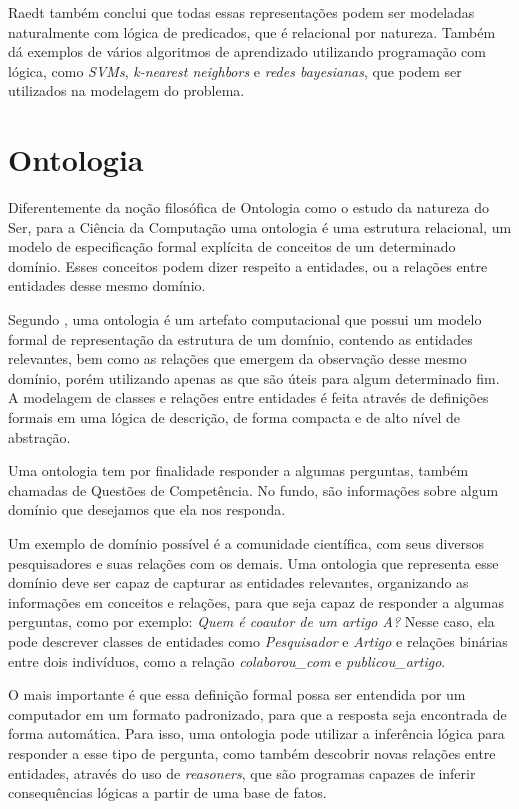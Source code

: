Raedt também conclui que todas essas representações podem ser modeladas naturalmente com lógica de predicados, que é relacional por natureza. Também dá exemplos de vários algoritmos de aprendizado utilizando programação com lógica,
como \textit{SVMs}, \textit{k-nearest neighbors} e \textit{redes bayesianas}, que podem ser utilizados na modelagem do problema.

\section{Ontologia}
\label{sec:ontologia}

Diferentemente da noção filosófica de Ontologia como o estudo da natureza do Ser, para a Ciência da Computação uma ontologia é uma estrutura relacional, um modelo de especificação formal explícita de conceitos de um determinado domínio.
Esses conceitos podem dizer respeito a entidades, ou a relações entre entidades desse mesmo domínio.

Segundo \citet{Guarino2009}, uma ontologia é um artefato computacional que possui um modelo formal de representação da estrutura de um domínio, contendo as entidades relevantes, bem como as relações que emergem da observação desse mesmo domínio, porém utilizando apenas as que são úteis para algum determinado fim. A modelagem de classes e relações entre entidades é feita através de definições formais em uma lógica de descrição, de forma compacta e de alto nível de abstração.

Uma ontologia tem por finalidade responder a algumas perguntas, também chamadas de Questões de Competência. No fundo, são informações sobre algum domínio que desejamos que ela nos responda.

Um exemplo de domínio possível é a comunidade científica, com seus diversos pesquisadores e suas relações com os demais. Uma ontologia que representa esse domínio deve ser capaz de capturar as entidades relevantes, organizando as informações em conceitos e relações, para que seja capaz de responder a algumas perguntas, como por exemplo: \textit{Quem é coautor de um artigo A?} Nesse caso, ela pode descrever classes de entidades como \textit{Pesquisador} e \textit{Artigo} e relações binárias entre dois indivíduos, como a relação \textit{colaborou\_com} e \textit{publicou\_artigo}.

O mais importante é que essa definição formal possa ser entendida por um computador em um formato padronizado, para que a resposta seja encontrada de forma automática. Para isso, uma ontologia pode utilizar a inferência lógica para responder a esse tipo de pergunta, como também descobrir novas relações entre entidades, através do uso de \textit{reasoners}, que são programas capazes de inferir consequências lógicas a partir de uma base de fatos.

